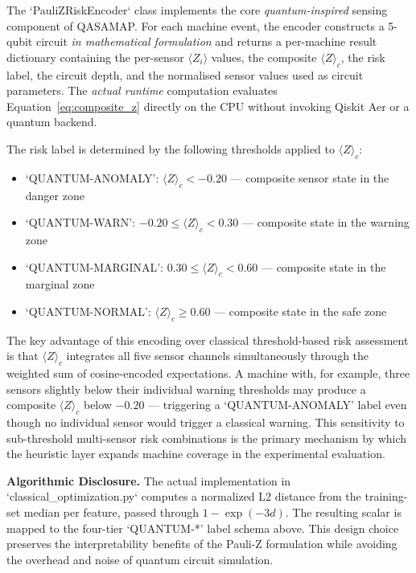 The `PauliZRiskEncoder` class implements the core \emph{quantum-inspired} sensing component of QASAMAP. For each machine event, the encoder constructs a 5-qubit circuit \emph{in mathematical formulation} and returns a per-machine result dictionary containing the per-sensor $\langle Z_i \rangle$ values, the composite $\langle Z \rangle_c$, the risk label, the circuit depth, and the normalised sensor values used as circuit parameters. The \emph{actual runtime} computation evaluates Equation~\eqref{eq:composite_z} directly on the CPU without invoking Qiskit Aer or a quantum backend.

The risk label is determined by the following thresholds applied to $\langle Z \rangle_c$:
\begin{itemize}
    \item `QUANTUM-ANOMALY': $\langle Z \rangle_c < -0.20$ --- composite sensor state in the danger zone
    \item `QUANTUM-WARN': $-0.20 \leq \langle Z \rangle_c < 0.30$ --- composite state in the warning zone
    \item `QUANTUM-MARGINAL': $0.30 \leq \langle Z \rangle_c < 0.60$ --- composite state in the marginal zone
    \item `QUANTUM-NORMAL': $\langle Z \rangle_c \geq 0.60$ --- composite state in the safe zone
\end{itemize}

The key advantage of this encoding over classical threshold-based risk assessment is that $\langle Z \rangle_c$ integrates all five sensor channels simultaneously through the weighted sum of cosine-encoded expectations. A machine with, for example, three sensors slightly below their individual warning thresholds may produce a composite $\langle Z \rangle_c$ below $-0.20$ --- triggering a `QUANTUM-ANOMALY' label even though no individual sensor would trigger a classical warning. This sensitivity to sub-threshold multi-sensor risk combinations is the primary mechanism by which the heuristic layer expands machine coverage in the experimental evaluation.

\textbf{Algorithmic Disclosure.} The actual implementation in `classical_optimization.py` computes a normalized L2 distance from the training-set median per feature, passed through $1 - \exp(-3d)$. The resulting scalar is mapped to the four-tier `QUANTUM-*' label schema above. This design choice preserves the interpretability benefits of the Pauli-Z formulation while avoiding the overhead and noise of quantum circuit simulation.

